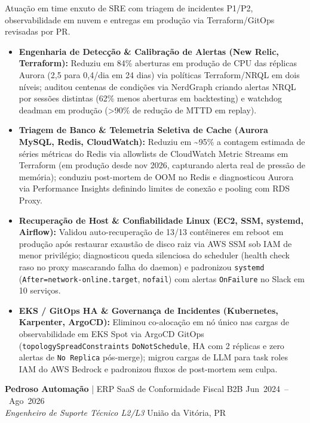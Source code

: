 \documentclass[10pt,a4paper]{article}
\begin{document}
Atuação em time enxuto de SRE com triagem de incidentes \mbox{P1/P2}, observabilidade em nuvem e entregas em produção via Terraform/GitOps revisadas por PR.
\begin{itemize}[topsep=1.5pt]
    \item \textbf{Engenharia de Detecção \& Calibração de Alertas (New Relic, Terraform):} Reduziu em 84\% aberturas em produção de CPU das réplicas Aurora (2,5 para 0,4/dia em 24 dias) via políticas Terraform/NRQL em dois níveis; auditou centenas de condições via NerdGraph criando alertas NRQL por sessões distintas (62\% menos aberturas em backtesting) e watchdog deadman em produção (>90\% de redução de MTTD em replay).
    \item \textbf{Triagem de Banco \& Telemetria Seletiva de Cache (Aurora MySQL, Redis, CloudWatch):} Reduziu em \textasciitilde{}95\% a contagem estimada de séries métricas do Redis via allowlists de CloudWatch Metric Streams em Terraform (em produção desde nov 2026, capturando alerta real de pressão de memória); conduziu \mbox{post-mortem} de OOM no Redis e diagnosticou Aurora via Performance Insights definindo limites de conexão e pooling com RDS Proxy.
    \item \textbf{Recuperação de Host \& Confiabilidade Linux (EC2, SSM, systemd, Airflow):} Validou \mbox{auto-recuperação} de 13/13 contêineres em reboot em produção após restaurar exaustão de disco raiz via AWS SSM sob IAM de menor privilégio; diagnosticou queda silenciosa do scheduler (health check raso no proxy mascarando falha do daemon) e padronizou \texttt{systemd} (\mbox{\texttt{After=network-online.target}}, \texttt{nofail}) com alertas \texttt{OnFailure} no Slack em 10 serviços.
    \item \textbf{EKS / GitOps HA \& Governança de Incidentes (Kubernetes, Karpenter, ArgoCD):} Eliminou \mbox{co-alocação} em nó único nas cargas de observabilidade em EKS Spot via ArgoCD GitOps (\mbox{\texttt{topologySpreadConstraints}} \mbox{\texttt{DoNotSchedule}}, HA com 2 réplicas e zero alertas de \texttt{No Replica} \mbox{pós-merge}); migrou cargas de LLM para task roles IAM do AWS Bedrock e padronizou fluxos de \mbox{post-mortem} sem culpa.
\end{itemize}

\newpage
\textbf{Pedroso Automação} | ERP SaaS de Conformidade Fiscal B2B \hfill \mbox{Jun 2024 -- Ago 2026} \\
\textit{Engenheiro de Suporte Técnico \mbox{L2/L3}} \hfill União da Vitória, PR
\end{document}
